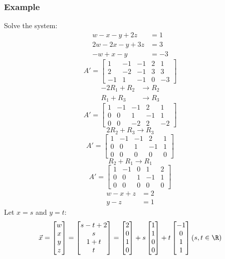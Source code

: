 \documentclass{math}
\begin{document}
\subsubsection*{Example}
Solve the system:
\begin{align*}
  w-x-y+2z &= 1 \\
  2w-2x-y+3z &= 3 \\
  -w+x-y &= -3
\end{align*}
\[ A' = \left[\begin{array}{cccc|c}
  1 & -1 & -1 & 2 & 1 \\
  2 & -2 & -1 & 3 & 3 \\
  -1 & 1 & -1 & 0 & -3
\end{array}\right] \]
\begin{align*}
  -2R_1+R_2 &\to R_2 \\
  R_1+R_3 &\to R_3
\end{align*}
\[ A' = \left[\begin{array}{cccc|c}
  1 & -1 & -1 & 2 & 1 \\
  0 & 0 & 1 & -1 & 1 \\
  0 & 0 & -2 & 2 & -2
\end{array}\right] \]
\[ 2R_2+R_3 \to R_3 \]
\[ A' = \left[\begin{array}{cccc|c}
  1 & -1 & -1 & 2 & 1 \\
  0 & 0 & 1 & -1 & 1 \\
  0 & 0 & 0 & 0 & 0
\end{array}\right] \]
\[ R_2+R_1 \to R_1 \]
\[ A' = \left[\begin{array}{cccc|c}
  1 & -1 & 0 & 1 & 2 \\
  0 & 0 & 1 & -1 & 1 \\
  0 & 0 & 0 & 0 & 0
\end{array}\right] \]
\begin{align*}
  w-x+z &= 2 \\
  y-z &= 1
\end{align*}
Let \( x = s \) and \( y = t \):
\[ \vec{x} = \begin{bmatrix}
  w \\ x \\ y \\ z
\end{bmatrix} = \begin{bmatrix}
  s-t+2 \\
  s \\
  1+t \\
  t
\end{bmatrix} = \begin{bmatrix}
  2 \\ 0 \\ 1 \\ 0
\end{bmatrix}+s\begin{bmatrix}
  1 \\ 1 \\ 0 \\ 0
\end{bmatrix}+t\begin{bmatrix}
  -1 \\ 0 \\ 1 \\ 1
\end{bmatrix} (s,t\in\R) \]
\end{document}
